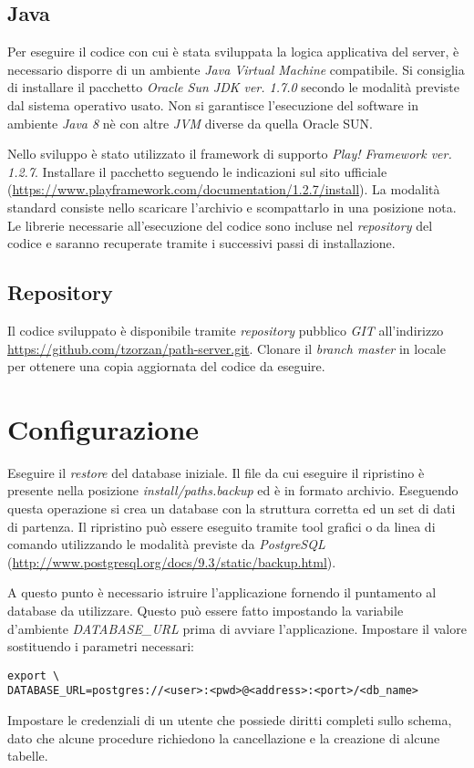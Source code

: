 \subsection{Java}
Per eseguire il codice con cui è stata sviluppata la logica applicativa del server, è necessario disporre di un ambiente \emph{Java Virtual Machine} compatibile. Si consiglia di installare il pacchetto \emph{Oracle Sun JDK ver. 1.7.0} secondo le modalità previste dal sistema operativo usato. Non si garantisce l'esecuzione del software in ambiente \emph{Java 8} nè con altre \emph{JVM} diverse da quella Oracle SUN.

Nello sviluppo è stato utilizzato il framework di supporto \emph{Play! Framework ver. 1.2.7}. Installare il pacchetto seguendo le indicazioni sul sito ufficiale (\url{https://www.playframework.com/documentation/1.2.7/install}). La modalità standard consiste nello scaricare l'archivio e scompattarlo in una posizione nota.
Le librerie necessarie all'esecuzione del codice sono incluse nel \emph{repository} del codice e saranno recuperate tramite i successivi passi di installazione.

\subsection{Repository}
Il codice sviluppato è disponibile tramite \emph{repository} pubblico \emph{GIT} all'indirizzo \url{https://github.com/tzorzan/path-server.git}. Clonare il \emph{branch master} in locale per ottenere una copia aggiornata del codice da eseguire.

\section{Configurazione}
Eseguire il \emph{restore} del database iniziale. Il file da cui eseguire il ripristino è presente nella posizione \emph{install/paths.backup} ed è in formato archivio. Eseguendo questa operazione si crea un database con la struttura corretta ed un set di dati di partenza. Il ripristino può essere eseguito tramite tool grafici o da linea di comando utilizzando le modalità previste da \emph{PostgreSQL} (\url{http://www.postgresql.org/docs/9.3/static/backup.html}).

A questo punto è necessario istruire l'applicazione fornendo il puntamento al database da utilizzare. Questo può essere fatto impostando la variabile d'ambiente \emph{DATABASE\_URL} prima di avviare l'applicazione. Impostare il valore sostituendo i parametri necessari:
\begin{verbatim}
export \
DATABASE_URL=postgres://<user>:<pwd>@<address>:<port>/<db_name>
\end{verbatim}
Impostare le credenziali di un utente che possiede diritti completi sullo schema, dato che alcune procedure richiedono la cancellazione e la creazione di alcune tabelle.

